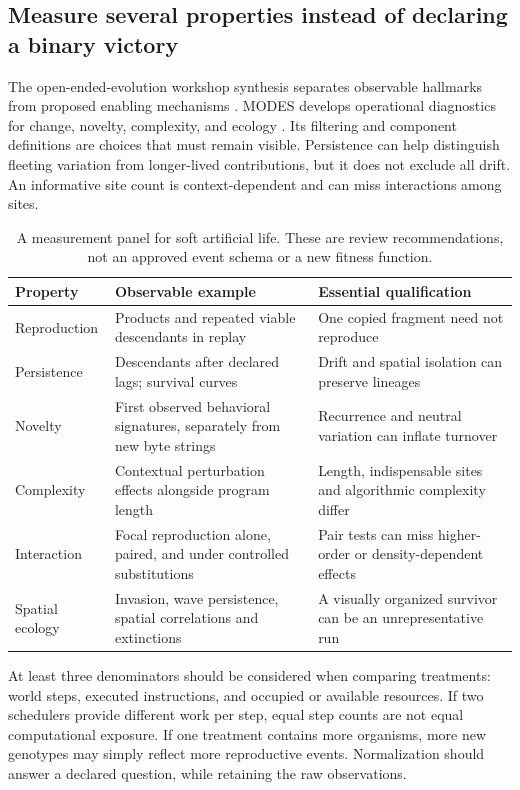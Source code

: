 \subsection{Measure several properties instead of declaring a binary victory}
The open-ended-evolution workshop synthesis separates observable hallmarks
from proposed enabling mechanisms \citep{Taylor2016}. MODES develops
operational diagnostics for change, novelty, complexity, and ecology
\citep{Dolson2019}. Its filtering and component definitions are choices that
must remain visible. Persistence can help distinguish fleeting variation from
longer-lived contributions, but it does not exclude all drift. An informative
site count is context-dependent and can miss interactions among sites.

\begin{table}[htbp]
\centering\small
\caption{A measurement panel for soft artificial life. These are review
recommendations, not an approved event schema or a new fitness function.}
\begin{tabularx}{\textwidth}{@{}>{\raggedright\arraybackslash}p{28mm}YY@{}}
\toprule
Property & Observable example & Essential qualification \\
\midrule
Reproduction & Products and repeated viable descendants in replay & One copied fragment need not reproduce \\
Persistence & Descendants after declared lags; survival curves & Drift and spatial isolation can preserve lineages \\
Novelty & First observed behavioral signatures, separately from new byte strings & Recurrence and neutral variation can inflate turnover \\
Complexity & Contextual perturbation effects alongside program length & Length, indispensable sites and algorithmic complexity differ \\
Interaction & Focal reproduction alone, paired, and under controlled substitutions & Pair tests can miss higher-order or density-dependent effects \\
Spatial ecology & Invasion, wave persistence, spatial correlations and extinctions & A visually organized survivor can be an unrepresentative run \\
\bottomrule
\end{tabularx}
\label{tab:measurement}
\end{table}

At least three denominators should be considered when comparing treatments:
world steps, executed instructions, and occupied or available resources.
If two schedulers provide different work per step, equal step counts are not
equal computational exposure. If one treatment contains more organisms, more
new genotypes may simply reflect more reproductive events. Normalization
should answer a declared question, while retaining the raw observations.


